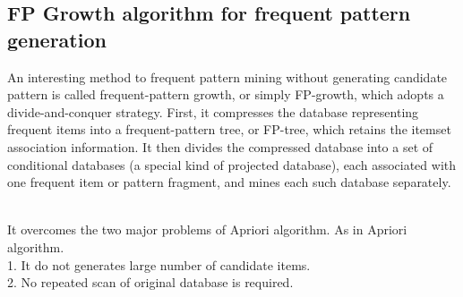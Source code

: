 \documentclass{article}\usepackage[]{graphicx}\usepackage[]{color}
\begin{document}
\subsection{FP  Growth  algorithm  for  frequent  pattern generation}\hspace{0.9cm}An interesting method to frequent pattern mining without generating candidate pattern is called frequent-pattern growth, or simply FP-growth, which adopts a divide-and-conquer strategy. First, it compresses the database representing frequent items into a frequent-pattern tree, or FP-tree, which retains the itemset association information. It then divides the compressed database into a set of conditional databases (a special kind of projected database), each associated with one frequent item or pattern fragment, and mines each such database separately\cite{[7]}.\par\\
\hspace{0.5cm}It overcomes the two major problems of Apriori algorithm. As in Apriori algorithm.\\
1. It do not generates large number of candidate items. \\
2. No repeated scan of original database is required. \\
\end{document}
